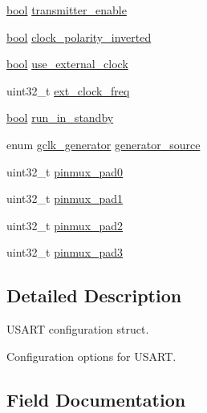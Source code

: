 \begin{DoxyCompactItemize}
\item 
\mbox{\hyperlink{group__group__sam0__utils_ga97a80ca1602ebf2303258971a2c938e2}{bool}} \mbox{\hyperlink{structusart__config_a52ca09b63cefc4328e0d04225651d709}{transmitter\+\_\+enable}}
\item 
\mbox{\hyperlink{group__group__sam0__utils_ga97a80ca1602ebf2303258971a2c938e2}{bool}} \mbox{\hyperlink{structusart__config_ac21b234a3fea28702115e060d7f5b204}{clock\+\_\+polarity\+\_\+inverted}}
\item 
\mbox{\hyperlink{group__group__sam0__utils_ga97a80ca1602ebf2303258971a2c938e2}{bool}} \mbox{\hyperlink{structusart__config_a89f38baff20ec53160e32c3343fe4f92}{use\+\_\+external\+\_\+clock}}
\item 
uint32\+\_\+t \mbox{\hyperlink{structusart__config_a0207dab3adef604c14018e51f33ababd}{ext\+\_\+clock\+\_\+freq}}
\item 
\mbox{\hyperlink{group__group__sam0__utils_ga97a80ca1602ebf2303258971a2c938e2}{bool}} \mbox{\hyperlink{structusart__config_a514964d5c2a8da4dd96bac82a53477f2}{run\+\_\+in\+\_\+standby}}
\item 
enum \mbox{\hyperlink{group__asfdoc__sam0__system__clock__group_ga1ab9bb87560ad127ed982591b7d67311}{gclk\+\_\+generator}} \mbox{\hyperlink{structusart__config_a2dba667c6d06bff254b7284d45dd02a3}{generator\+\_\+source}}
\item 
uint32\+\_\+t \mbox{\hyperlink{structusart__config_a36c58e420cf9b44d2f6cc8042f81b5d6}{pinmux\+\_\+pad0}}
\item 
uint32\+\_\+t \mbox{\hyperlink{structusart__config_acbc2a9a6d4bee7422a98b6af97e470dc}{pinmux\+\_\+pad1}}
\item 
uint32\+\_\+t \mbox{\hyperlink{structusart__config_ac2961331910efba2dd3a1f865bb34e74}{pinmux\+\_\+pad2}}
\item 
uint32\+\_\+t \mbox{\hyperlink{structusart__config_aa0b3c5c2950e092fe55c7bc2fab47d75}{pinmux\+\_\+pad3}}
\end{DoxyCompactItemize}


\subsection{Detailed Description}
U\+S\+A\+RT configuration struct. 

Configuration options for U\+S\+A\+RT. 

\subsection{Field Documentation}
\mbox{\label{structusart__config_ac4f06ea26ed6bd7ae83b92d64ac10b78}} 
